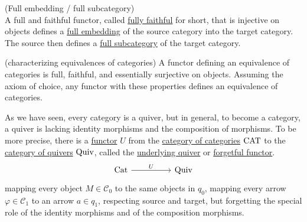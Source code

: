 \begin{definition}{(Full embedding / full subcategory)}\label{def:full_fully}\phantom{}\\
A full and faithful functor, called \ul{fully faithful} for short, that is injective on objects defines a \ul{full embedding} of the
source category into the target category. The source then defines a \ul{full subcategory} of the target category.
\end{definition}

\begin{theorem}{(characterizing equivalences of categories)}\label{thm:equiv_fully_faithful}
A functor defining an equivalence of categories is full, faithful, and essentially surjective on objects. Assuming the axiom of choice,
any functor with these properties defines an equivalence of categories.
\end{theorem}

\noindent As we have seen, every category is a quiver, but in general, to become a category, a quiver is lacking identity morphisms
and the composition of morphisms. To be more precise, there is a \ul{functor} $U$ from the \ul{category of categories} $\textup{CAT}$ to the
\ul{category of quivers} $\textup{Quiv}$, called the \ul{underlying quiver} or \ul{forgetful functor}.
\[
\begin{tikzcd}
\textup{Cat} \arrow[rr,"U"] &  & \textup{Quiv}
\end{tikzcd}
\]
mapping every object $M \in \mathcal{C}_{0}$ to the same objects in $q_{0}$, mapping every arrow $\varphi \in \mathcal{C}_{1}$ to 
an arrow $a \in q_{1}$, respecting source and target, but forgetting the special role of the identity morphisms and of the composition morphisms.

